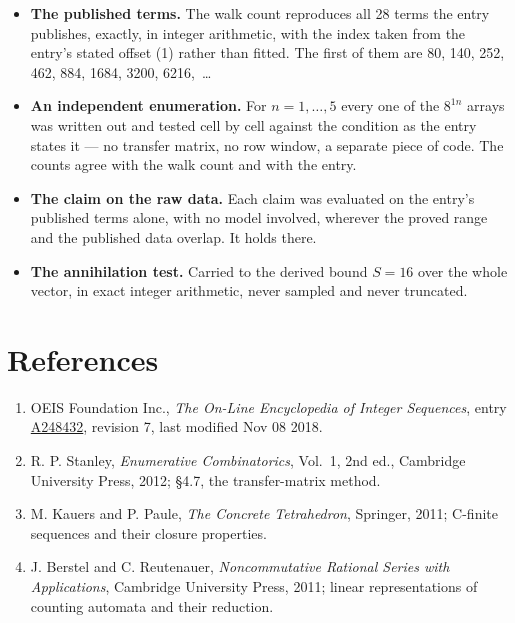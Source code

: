 \documentclass[11pt]{article}
\theoremstyle{definition}
\begin{document}
\begin{itemize}

\item {\bfseries The published terms.} The walk count reproduces all 28 terms the entry publishes, exactly, in integer arithmetic, with the index taken from the entry's stated offset (1) rather than fitted. The first of them are 80, 140, 252, 462, 884, 1684, 3200, 6216,~\dots

\item {\bfseries An independent enumeration.} For $n = 1,\dots,5$ every one of the $8^{1n}$ arrays was written out and tested cell by cell against the condition as the entry states it --- no transfer matrix, no row window, a separate piece of code. The counts agree with the walk count and with the entry.

\item {\bfseries The claim on the raw data.} Each claim was evaluated on the entry's published terms alone, with no model involved, wherever the proved range and the published data overlap. It holds there.

\item {\bfseries The annihilation test.} Carried to the derived bound $S = 16$ over the whole vector, in exact integer arithmetic, never sampled and never truncated.

\end{itemize}

\section{References}

\begin{enumerate}

\item OEIS Foundation Inc., \emph{The On-Line Encyclopedia of Integer Sequences}, entry \href{https://oeis.org/A248432}{A248432}, revision 7, last modified Nov 08 2018.

\item R. P. Stanley, \emph{Enumerative Combinatorics}, Vol.~1, 2nd ed., Cambridge University Press, 2012; \S4.7, the transfer-matrix method.

\item M. Kauers and P. Paule, \emph{The Concrete Tetrahedron}, Springer, 2011; C-finite sequences and their closure properties.

\item J. Berstel and C. Reutenauer, \emph{Noncommutative Rational Series with Applications}, Cambridge University Press, 2011; linear representations of counting automata and their reduction.

\end{enumerate}
\end{document}
